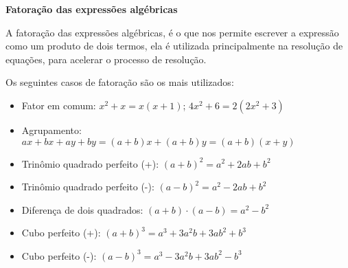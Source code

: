  \vskip0.3cm 

  \textbf{Fatoração das expressões algébricas}
  
 \vskip0.3cm 
 
 A fatoração das expressões algébricas, é o que nos permite escrever a expressão como um produto de dois termos, ela é utilizada principalmente na resolução de equações, para acelerar o processo de resolução.
 
 Os seguintes casos de fatoração são os mais utilizados:
 \begin{itemize} 
  \item Fator em comum: $x^2 + x= x(x + 1)$; $4x^2 + 6= 2(2x^2 + 3)$
  \item Agrupamento: $ax + bx + ay + by= (a+b)x+(a+b)y= (a+b)(x+y)$
  \item Trinômio quadrado perfeito (+): $(a + b)^2= a^2 + 2ab + b^2$ 
  \item Trinômio quadrado perfeito (-): $(a - b)^2= a^2 - 2ab + b^2$
  \item Diferença de dois quadrados: $(a + b) \cdot (a - b)= a^2 - b^2$
  \item Cubo perfeito (+): $(a+b)^3= a^3 + 3a^2b + 3ab^2 + b^3$
  \item Cubo perfeito (-): $(a-b)^3= a^3 - 3a^2b + 3ab^2 - b^3$
 \end{itemize}
 
 \newpage
 
